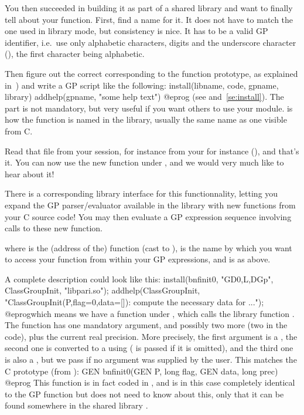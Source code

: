 You then succeeded in building it as part of a shared library and want to
finally tell  about your function. First, find a name for it. It does
not have to match the one used in library mode, but consistency is nice. It
has to be a valid GP identifier, i.e.~use only alphabetic characters, digits
and the underscore character (\kbd{\_}), the first character being
alphabetic.

Then figure out the correct  corresponding to the function
prototype, as explained in~) and write a GP script
like the following:
\bprog
install(libname, code, gpname, library)
addhelp(gpname, "some help text")
@eprog
\noindent(see  and~\ref{se:install}). The 
part is not mandatory, but very useful if you want others to use your
module.  is how the function is named in the library,
usually the same name as one visible from C.

Read that file from your  session, for instance from your
 for instance (), and that's it. You
can now use the new function  under , and we would very
much like to hear about it! \smallskip

There is a corresponding library interface for this functionnality, letting
you expand the GP parser/evaluator available in the library with new
functions from your C source code! You may then 
evaluate a GP expression sequence involving calls to these new function.


\noindent where  is the (address of the) function (cast to
),  is the name by which you want to access your
function from within your GP expressions, and  is as above.

A complete description could look like this:
\bprog
{
  install(bnfinit0, "GD0,L,DGp", ClassGroupInit, "libpari.so");
  addhelp(ClassGroupInit, "ClassGroupInit(P,{flag=0},{data=[]}):
    compute the necessary data for ...");
}
@eprog\noindent which means we have a function  under
, which calls the library function  . The function has
one mandatory argument, and possibly two more (two  in the code),
plus the current real precision. More precisely, the first argument is a
, the second one is converted to a  using 
( is passed if it is omitted), and the third one is also a ,
but we pass  if no argument was supplied by the user. This matches
the C prototype (from ):
%
\bprog
  GEN bnfinit0(GEN P, long flag, GEN data, long prec)
@eprog\noindent
This function is in fact coded in , and is in this case
completely identical to the GP function  but  does not
need to know about this, only that it can be found somewhere in the shared
library .

